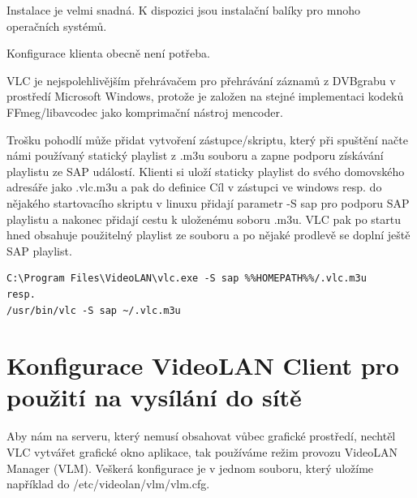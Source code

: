 \vspace{10pt}

Instalace je velmi snadná. K dispozici jsou instalační balíky pro mnoho operačních systémů.

\vspace{10pt}

Konfigurace klienta obecně není potřeba. 

\vspace{10pt}

VLC je nejspolehlivějším přehrávačem pro přehrávání záznamů z DVBgrabu v prostředí Microsoft Windows, protože je založen na stejné implementaci kodeků FFmeg/libavcodec jako komprimační nástroj mencoder.

Trošku pohodlí může přidat vytvoření zástupce/skriptu, který při spuštění načte námi používaný statický playlist z .m3u souboru a zapne podporu získávání playlistu ze SAP událostí. Klienti si uloží staticky playlist do svého domovského adresáře jako .vlc.m3u a pak do definice Cíl v zástupci ve windows resp. do nějakého startovacího skriptu v linuxu přidají parametr -S sap pro podporu SAP playlistu a nakonec přidají cestu k uloženému soboru .m3u. VLC pak po startu hned obsahuje použitelný playlist ze souboru a po nějaké prodlevě se doplní ještě SAP playlist.

\vspace{10pt}

\begin{small}
\begin{verbatim}
C:\Program Files\VideoLAN\vlc.exe -S sap %%HOMEPATH%%/.vlc.m3u
resp.
/usr/bin/vlc -S sap ~/.vlc.m3u
\end{verbatim}
\end{small}

\vspace{10pt}

\section{Konfigurace VideoLAN Client pro použití na vysílání do sítě}

\vspace{10pt}

Aby nám na serveru, který nemusí obsahovat vůbec grafické prostředí, nechtěl VLC vytvářet grafické okno aplikace, tak používáme režim provozu VideoLAN Manager (VLM). Veškerá konfigurace je v jednom souboru, který uložíme například do /etc/videolan/vlm/vlm.cfg.

\vspace{10pt}

